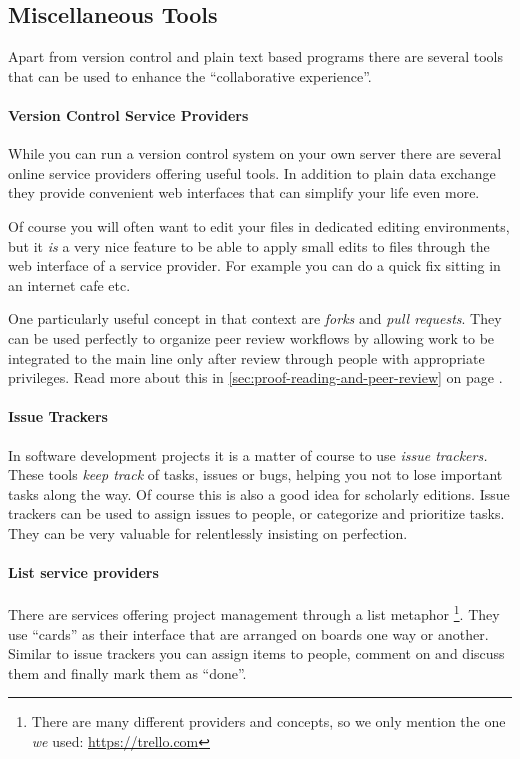 \documentclass[11pt,a4paper]{article}
\begin{document}
\subsection{Miscellaneous Tools}
Apart from version control and plain text based programs there are several tools that
can be used to enhance the “collaborative experience”.

\paragraph{Version Control Service Providers}
While you can run a version control system on your own server there are several online service providers offering useful tools. In addition to plain data exchange they
provide convenient web interfaces that can simplify your life even more.

Of course you will often want to edit your files in dedicated editing environments, but
it \emph{is} a very nice feature to be able to apply small edits to files through the web 
interface of a service provider. For example you can do a quick fix sitting in an internet
cafe etc.

One particularly useful concept in that context are \emph{forks} and \emph{pull requests}.
They can be used perfectly to organize peer review workflows by allowing work to be
integrated to the main line only after review through people with appropriate privileges.
Read more about this in \ref{sec:proof-reading-and-peer-review} on page \pageref{sec:proof-reading-and-peer-review}.

\paragraph{Issue Trackers}
In software development projects it is a matter of course to use \emph{issue trackers.}
These tools \emph{keep track} of tasks, issues or bugs, helping you not to lose important
tasks along the way. Of course this is also a good idea for scholarly editions. Issue
trackers can be used to assign issues to people, or categorize and prioritize tasks.
They can be very valuable for relentlessly insisting on perfection.

\paragraph{List service providers}
There are services offering project management through a list metaphor%
\footnote{There are many different providers and concepts, so we only mention the one
\emph{we} used: \url{https://trello.com}}.
They use “cards” as their interface that are arranged on boards one way or another.
Similar to issue trackers you can assign items to people, comment on and discuss them and
finally mark them as “done”.
\end{document}
